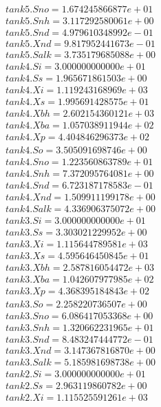 \begin{align*}
    tank5.Sno = 1.674245866877e+01\\
    tank5.Snh = 3.117292580061e+00\\
    tank5.Snd = 4.979610348992e-01\\
    tank5.Xnd = 9.817952441673e-01\\
    tank5.Salk = 3.735179685088e+00\\
    tank4.Si = 3.000000000000e+01\\
    tank4.Ss = 1.965671861503e+00\\
    tank4.Xi = 1.119243168969e+03\\
    tank4.Xs = 1.995691428575e+01\\
    tank4.Xbh = 2.602154360121e+03\\
    tank4.Xba = 1.057038911944e+02\\
    tank4.Xp = 4.404846296373e+02\\
    tank4.So = 3.505091698746e+00\\
    tank4.Sno = 1.223560863789e+01\\
    tank4.Snh = 7.372095764081e+00\\
    tank4.Snd = 6.723187178583e-01\\
    tank4.Xnd = 1.509911199178e+00\\
    tank4.Salk = 4.336906375072e+00\\
    tank3.Si = 3.000000000000e+01\\
    tank3.Ss = 3.303021229952e+00\\
    tank3.Xi = 1.115644789581e+03\\
    tank3.Xs = 4.595646450845e+01\\
    tank3.Xbh = 2.587816054472e+03\\
    tank3.Xba = 1.042607977985e+02\\
    tank3.Xp = 4.368395184843e+02\\
    tank3.So = 2.258220736507e+00\\
    tank3.Sno = 6.086417053368e+00\\
    tank3.Snh = 1.320662231965e+01\\
    tank3.Snd = 8.483247444772e-01\\
    tank3.Xnd = 3.147367816870e+00\\
    tank3.Salk = 5.185981698738e+00\\
    tank2.Si = 3.000000000000e+01\\
    tank2.Ss = 2.963119860782e+00\\
    tank2.Xi = 1.115525591261e+03\\

\end{align*}
